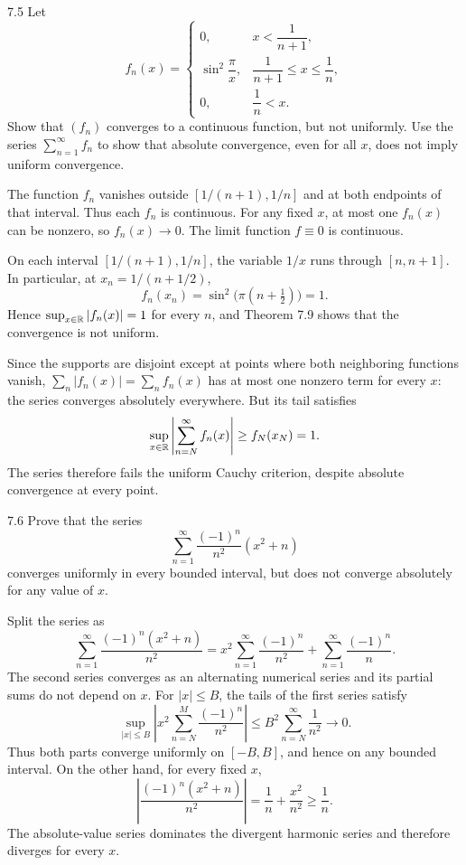 \documentclass[11pt, oneside]{article}
\begin{document}
\begin{exercise}{7.5}
Let
\[
 f_n(x)=\begin{cases}
 0, &x<\dfrac1{n+1}, \\[3pt]
 \sin^2\!\dfrac{\pi}{x}, &\dfrac1{n+1}\le x\le\dfrac1n, \\[5pt]
 0, &\dfrac1n<x.
 \end{cases}
\]
Show that $(f_n)$ converges to a continuous function, but not uniformly. Use the series $\displaystyle\sum_{n=1}^{\infty}f_n$ to show that absolute convergence, even for all $x$, does not imply uniform convergence.
\end{exercise}
\begin{solution}
The function $f_n$ vanishes outside $[1/(n+1), 1/n]$ and at both endpoints of that interval. Thus each $f_n$ is continuous. For any fixed $x$, at most one $f_n(x)$ can be nonzero, so $f_n(x)\to0$. The limit function $f\equiv0$ is continuous.

On each interval $[1/(n+1), 1/n]$, the variable $1/x$ runs through $[n, n+1]$. In particular, at $x_n=1/(n+1/2)$,
\[
 f_n(x_n)=\sin^2\bigl(\pi(n+\tfrac12)\bigr)=1.
\]
Hence $\sup_{x\in\mathbb{R}}|f_n(x)|=1$ for every $n$, and Theorem 7.9 shows that the convergence is not uniform.

Since the supports are disjoint except at points where both neighboring functions vanish, $\sum_n|f_n(x)|=\sum_nf_n(x)$ has at most one nonzero term for every $x$: the series converges absolutely everywhere. But its tail satisfies
\[
 \sup_{x\in\mathbb{R}}\left|\sum_{n=N}^{\infty}f_n(x)\right|\ge f_N(x_N)=1.
\]
The series therefore fails the uniform Cauchy criterion, despite absolute convergence at every point.
\end{solution}

\begin{exercise}{7.6}
Prove that the series
\[
 \sum_{n=1}^{\infty}\frac{(-1)^n}{n^2}(x^2+n)
\]
converges uniformly in every bounded interval, but does not converge absolutely for any value of $x$.
\end{exercise}
\begin{solution}
Split the series as
\[
 \sum_{n=1}^{\infty}\frac{(-1)^n(x^2+n)}{n^2}
 =x^2\sum_{n=1}^{\infty}\frac{(-1)^n}{n^2}
  +\sum_{n=1}^{\infty}\frac{(-1)^n}{n}.
\]
The second series converges as an alternating numerical series and its partial sums do not depend on $x$. For $|x|\le B$, the tails of the first series satisfy
\[
 \sup_{|x|\le B}\left|x^2\sum_{n=N}^{M}\frac{(-1)^n}{n^2}\right|
 \le B^2\sum_{n=N}^{\infty}\frac1{n^2}\longrightarrow0.
\]
Thus both parts converge uniformly on $[-B, B]$, and hence on any bounded interval. On the other hand, for every fixed $x$,
\[
 \left|\frac{(-1)^n(x^2+n)}{n^2}\right|
 =\frac1n+\frac{x^2}{n^2}\ge\frac1n.
\]
The absolute-value series dominates the divergent harmonic series and therefore diverges for every $x$.
\end{solution}
\end{document}
